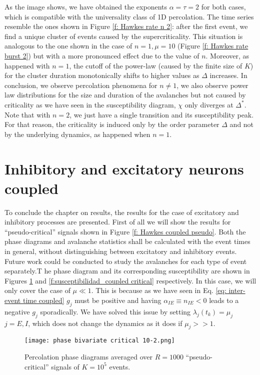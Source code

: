 As the image shows, we have obtained the exponents $\alpha=\tau=2$ for both cases, which is compatible with the universality class of 1D percolation. The time series resemble the ones
shown in Figure \ref{f: Hawkes rate n 2}: after the first event, we find a unique cluster of events caused by the supercriticality. This situation is analogous to the one shown in 
the case of $n=1, \mu=10$ (Figure \ref{f: Hawkes rate burst 2}) but with a more pronounced effect due to the value of $n$. Moreover, as happened with $n=1$, the cutoff of the power-law 
(caused by the finite size of $K$) for the cluster duration monotonically shifts to higher values as $\Delta$ increases.
In conclusion, we observe percolation phenomena for 
$n\neq 1$, we also observe power law distributions for the size and duration of the avalanches but not caused by criticality as we have seen in the susceptibility diagram, $\chi$ only diverges
at $\Delta^*$. 
Note that with $n=2$, we just have a single transition and its susceptibility peak. For that reason, the criticality is induced only by the order parameter $\Delta$ and not by the 
underlying dynamics, as happened when $n=1$.

\newpage
\section{Inhibitory and excitatory neurons coupled}

To conclude the chapter on results, the results for the case of excitatory and inhibitory processes are presented. First of all we will show the results for ``pseudo-critical'' 
signals shown in Figure \ref{f: Hawkes coupled pseudo}. Both the phase diagrams and avalanche statistics shall be calculated with the event times in general, without distinguishing
between excitatory and inhibitory events. Future work could be conducted to study the avalanches for each type of event separately.T he phase diagram and its corresponding susceptibility 
are shown in Figures \ref{f:phase_diagram_coupled critical} and \ref{f:susceptibilidad_coupled critical} respectively. In this case, we will only cover the case of $\mu\ll 1$. 
This is because as we have seen in Eq. \ref{eq: inter-event time coupled} $g_j$ must be positive and having $\alpha_{IE}\equiv n_{IE}<0$ leads to a negative $g_j$ sporadically. 
We have solved this issue by setting $\lambda_j(t_k)=\mu_j$ $j=E,I$, which does not change the dynamics as it does if $\mu_j>>1$.


\begin{figure}[H]
    \centering
    \texttt{[image: phase bivariate critical 10-2.png]}
    \caption{Percolation phase diagrams averaged over $R=1000$ ``pseudo-critical'' signals of $K=10^5$ events.}
    \label{f:phase_diagram_coupled critical}
\end{figure}

